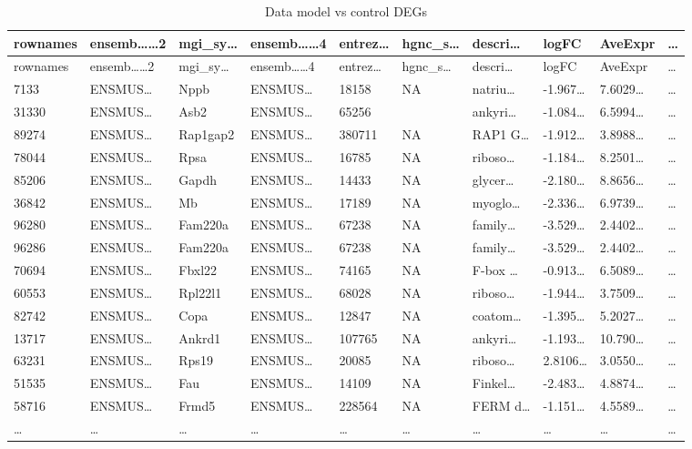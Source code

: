 \documentclass[
]{article}
\begin{document}
\begin{longtable}[]{@{}llllllllll@{}}
\caption{\label{tab:Data-model-vs-control-DEGs}Data model vs control DEGs}\tabularnewline
\toprule
rownames & ensemb\ldots\ldots2 & mgi\_sy\ldots{} & ensemb\ldots\ldots4 & entrez\ldots{} & hgnc\_s\ldots{} & descri\ldots{} & logFC & AveExpr & \ldots{}\tabularnewline
\midrule
\endfirsthead
\toprule
rownames & ensemb\ldots\ldots2 & mgi\_sy\ldots{} & ensemb\ldots\ldots4 & entrez\ldots{} & hgnc\_s\ldots{} & descri\ldots{} & logFC & AveExpr & \ldots{}\tabularnewline
\midrule
\endhead
7133 & ENSMUS\ldots{} & Nppb & ENSMUS\ldots{} & 18158 & NA & natriu\ldots{} & -1.967\ldots{} & 7.6029\ldots{} & \ldots{}\tabularnewline
31330 & ENSMUS\ldots{} & Asb2 & ENSMUS\ldots{} & 65256 & & ankyri\ldots{} & -1.084\ldots{} & 6.5994\ldots{} & \ldots{}\tabularnewline
89274 & ENSMUS\ldots{} & Rap1gap2 & ENSMUS\ldots{} & 380711 & NA & RAP1 G\ldots{} & -1.912\ldots{} & 3.8988\ldots{} & \ldots{}\tabularnewline
78044 & ENSMUS\ldots{} & Rpsa & ENSMUS\ldots{} & 16785 & NA & riboso\ldots{} & -1.184\ldots{} & 8.2501\ldots{} & \ldots{}\tabularnewline
85206 & ENSMUS\ldots{} & Gapdh & ENSMUS\ldots{} & 14433 & NA & glycer\ldots{} & -2.180\ldots{} & 8.8656\ldots{} & \ldots{}\tabularnewline
36842 & ENSMUS\ldots{} & Mb & ENSMUS\ldots{} & 17189 & NA & myoglo\ldots{} & -2.336\ldots{} & 6.9739\ldots{} & \ldots{}\tabularnewline
96280 & ENSMUS\ldots{} & Fam220a & ENSMUS\ldots{} & 67238 & NA & family\ldots{} & -3.529\ldots{} & 2.4402\ldots{} & \ldots{}\tabularnewline
96286 & ENSMUS\ldots{} & Fam220a & ENSMUS\ldots{} & 67238 & NA & family\ldots{} & -3.529\ldots{} & 2.4402\ldots{} & \ldots{}\tabularnewline
70694 & ENSMUS\ldots{} & Fbxl22 & ENSMUS\ldots{} & 74165 & NA & F-box \ldots{} & -0.913\ldots{} & 6.5089\ldots{} & \ldots{}\tabularnewline
60553 & ENSMUS\ldots{} & Rpl22l1 & ENSMUS\ldots{} & 68028 & NA & riboso\ldots{} & -1.944\ldots{} & 3.7509\ldots{} & \ldots{}\tabularnewline
82742 & ENSMUS\ldots{} & Copa & ENSMUS\ldots{} & 12847 & NA & coatom\ldots{} & -1.395\ldots{} & 5.2027\ldots{} & \ldots{}\tabularnewline
13717 & ENSMUS\ldots{} & Ankrd1 & ENSMUS\ldots{} & 107765 & NA & ankyri\ldots{} & -1.193\ldots{} & 10.790\ldots{} & \ldots{}\tabularnewline
63231 & ENSMUS\ldots{} & Rps19 & ENSMUS\ldots{} & 20085 & NA & riboso\ldots{} & 2.8106\ldots{} & 3.0550\ldots{} & \ldots{}\tabularnewline
51535 & ENSMUS\ldots{} & Fau & ENSMUS\ldots{} & 14109 & NA & Finkel\ldots{} & -2.483\ldots{} & 4.8874\ldots{} & \ldots{}\tabularnewline
58716 & ENSMUS\ldots{} & Frmd5 & ENSMUS\ldots{} & 228564 & NA & FERM d\ldots{} & -1.151\ldots{} & 4.5589\ldots{} & \ldots{}\tabularnewline
\ldots{} & \ldots{} & \ldots{} & \ldots{} & \ldots{} & \ldots{} & \ldots{} & \ldots{} & \ldots{} & \ldots{}\tabularnewline
\bottomrule
\end{longtable}
\end{document}
